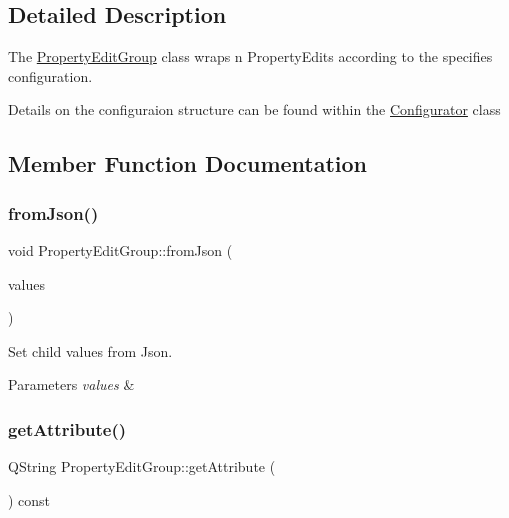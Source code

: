 \subsection{Detailed Description}
The \mbox{\hyperlink{class_property_edit_group}{Property\+Edit\+Group}} class wraps n Property\+Edits according to the specifies configuration. 

Details on the configuraion structure can be found within the \mbox{\hyperlink{class_configurator}{Configurator}} class 

\subsection{Member Function Documentation}
\mbox{\label{class_property_edit_group_ab67d4c9653391c01be0a094dcf33f750}} 
\subsubsection{\texorpdfstring{from\+Json()}{fromJson()}}
{\footnotesize\ttfamily void Property\+Edit\+Group\+::from\+Json (\begin{DoxyParamCaption}\item[{const Q\+Json\+Object \&}]{values }\end{DoxyParamCaption})}



Set child values from Json. 


\begin{DoxyParams}{Parameters}
{\em values} & \\
\hline
\end{DoxyParams}
\mbox{\label{class_property_edit_group_a1f29d82fefe5673830f941dc88a9fca3}} 
\subsubsection{\texorpdfstring{get\+Attribute()}{getAttribute()}}
{\footnotesize\ttfamily Q\+String Property\+Edit\+Group\+::get\+Attribute (\begin{DoxyParamCaption}{ }\end{DoxyParamCaption}) const}



